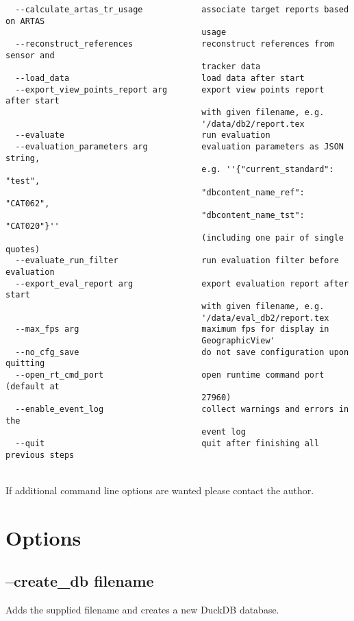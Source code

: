\begin{lstlisting}
  --calculate_artas_tr_usage            associate target reports based on ARTAS
                                        usage
  --reconstruct_references              reconstruct references from sensor and 
                                        tracker data
  --load_data                           load data after start
  --export_view_points_report arg       export view points report after start 
                                        with given filename, e.g. 
                                        '/data/db2/report.tex
  --evaluate                            run evaluation
  --evaluation_parameters arg           evaluation parameters as JSON string, 
                                        e.g. ''{"current_standard": "test", 
                                        "dbcontent_name_ref": "CAT062", 
                                        "dbcontent_name_tst": "CAT020"}'' 
                                        (including one pair of single quotes)
  --evaluate_run_filter                 run evaluation filter before evaluation
  --export_eval_report arg              export evaluation report after start 
                                        with given filename, e.g. 
                                        '/data/eval_db2/report.tex
  --max_fps arg                         maximum fps for display in 
                                        GeographicView'
  --no_cfg_save                         do not save configuration upon quitting
  --open_rt_cmd_port                    open runtime command port (default at 
                                        27960)
  --enable_event_log                    collect warnings and errors in the 
                                        event log
  --quit                                quit after finishing all previous steps
\end{lstlisting}
\ \\

If additional command line options are wanted please contact the author.

\section{Options}

\subsection{--create\_db filename}

Adds the supplied filename and creates a new DuckDB database.
 
